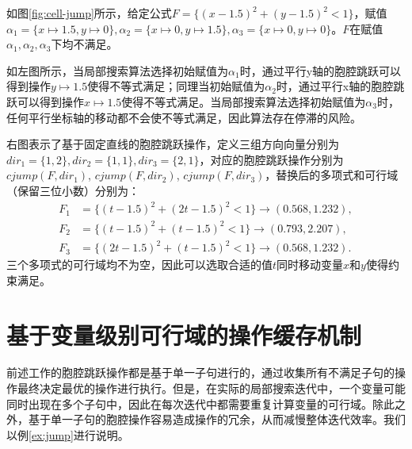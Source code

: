 \begin{example}
如图\ref{fig:cell-jump}所示，给定公式$F = \{(x - 1.5)^2 + (y - 1.5)^2 < 1\}$，赋值$\alpha_1 = \{x \mapsto 1.5, y \mapsto 0\}, \alpha_2 = \{x \mapsto 0, y \mapsto 1.5\}, \alpha_3 = \{x \mapsto 0, y \mapsto 0\}$。$F$在赋值$\alpha_1, \alpha_2, \alpha_3$下均不满足。

如左图所示，当局部搜索算法选择初始赋值为$\alpha_1$时，通过平行y轴的胞腔跳跃可以得到操作$y \mapsto 1.5$使得不等式满足；同理当初始赋值为$\alpha_2$时，通过平行x轴的胞腔跳跃可以得到操作$x \mapsto 1.5$使得不等式满足。当局部搜索算法选择初始赋值为$\alpha_3$时，任何平行坐标轴的移动都不会使不等式满足，因此算法存在停滞的风险。

右图表示了基于固定直线的胞腔跳跃操作，定义三组方向向量分别为$dir_1 = \{1, 2\}, dir_2 = \{1, 1\}, dir_3 = \{2, 1\}$，对应的胞腔跳跃操作分别为$cjump(F, dir_1)$, $cjump(F, dir_2)$, $cjump(F, dir_3)$，替换后的多项式和可行域（保留三位小数）分别为：
\begin{align*}
    F_1 &= \{(t - 1.5)^2 + (2t - 1.5)^2 < 1\} \rightarrow (0.568, 1.232), \\
    F_2 &= \{(t - 1.5)^2 + (t - 1.5)^2 < 1\} \rightarrow (0.793, 2.207), \\
    F_3 &= \{(2t - 1.5)^2 + (t - 1.5)^2 < 1\} \rightarrow (0.568, 1.232).
\end{align*}
三个多项式的可行域均不为空，因此可以选取合适的值$t$同时移动变量$x$和$y$使得约束满足。
\end{example}

\section{基于变量级别可行域的操作缓存机制}
前述工作的胞腔跳跃操作都是基于单一子句进行的，通过收集所有不满足子句的操作最终决定最优的操作进行执行。但是，在实际的局部搜索迭代中，一个变量可能同时出现在多个子句中，因此在每次迭代中都需要重复计算变量的可行域。除此之外，基于单一子句的胞腔操作容易造成操作的冗余，从而减慢整体迭代效率。我们以例\ref{ex:jump}进行说明。

